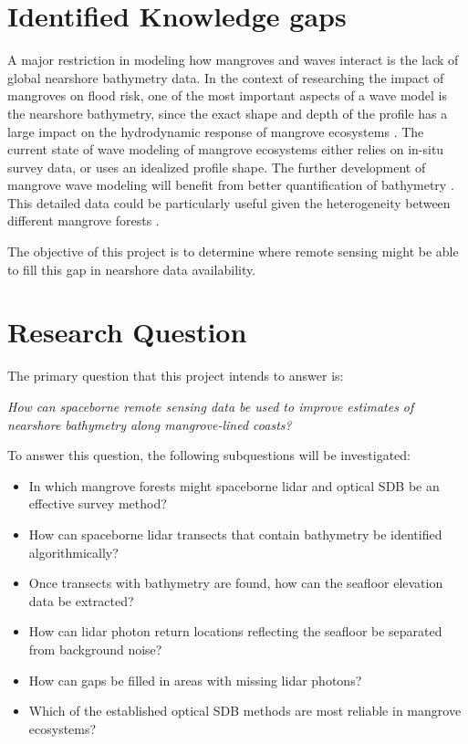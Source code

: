 \section{Identified Knowledge gaps}

A major restriction in modeling how mangroves and waves interact is the lack of global nearshore bathymetry data. In the context of researching the impact of mangroves on flood risk, one of the most important aspects of a wave model is the nearshore bathymetry, since the exact shape and depth of the profile has a large impact on the hydrodynamic response of mangrove ecosystems \parencite{Horstman2014,Maza2019}. The current state of wave modeling of mangrove ecosystems either relies on in-situ survey data, or uses an idealized profile shape. The further development of mangrove wave modeling will benefit from better quantification of bathymetry \parencite{Menendez2020,GijonMancheno2021}. This detailed data could be particularly useful given the heterogeneity between different mangrove forests \parencite{Mazda2013}.

The objective of this project is to determine where remote sensing might be able to fill this gap in nearshore data availability.

\section{Research Question}
The primary question that this project intends to answer is:

\emph{How can spaceborne remote sensing data be used to improve estimates of nearshore bathymetry along mangrove-lined coasts?}

To answer this question, the following subquestions will be investigated:

\begin{itemize}
      \item In which mangrove forests might spaceborne lidar and optical SDB be an effective survey method?
      \item How can spaceborne lidar transects that contain bathymetry be identified algorithmically?
      \item Once transects with bathymetry are found, how can the seafloor elevation data be extracted?
      \item How can lidar photon return locations reflecting the seafloor be separated from background noise?
      \item How can gaps be filled in areas with missing lidar photons?
      \item Which of the established optical SDB methods are most reliable in mangrove ecosystems?
\end{itemize}


